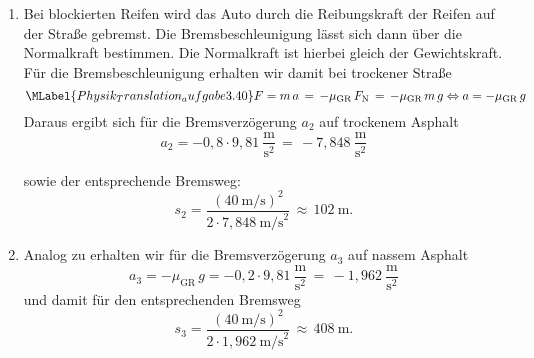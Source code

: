 \begin{MExercises}
\begin{MExercise}
\begin{MSolution}
\begin{enumerate}
               \item Bei blockierten Reifen wird das Auto durch die Reibungskraft der Reifen auf der Stra{\ss}e gebremst. Die Bremsbeschleunigung l\"asst sich dann \"uber die Normalkraft bestimmen. Die Normalkraft ist hierbei gleich der Gewichtskraft.
               F\"ur die Bremsbeschleunigung erhalten wir damit bei trockener Stra{\ss}e
               \begin{equation}\MLabel{Physik_Translation_aufgabe3.40}
               F = m\,a \,=\, -\mu_{\text{GR}}\,F_{\text{N}} \,=\, -\mu_{\text{GR}}\,m\,g
               \Leftrightarrow a = -\mu_{\text{GR}}\,g
               \end{equation}
               Daraus ergibt sich f\"ur die Bremsverz\"ogerung $a_{2}$ auf trockenem Asphalt 
               \begin{equation*}
               a_{2} = -{0,8}\cdot {9,81}~\frac{\text{m}}{\text{s}^{2}} \,=\, -{7,848}~\frac{\text{m}}{\text{s}^{2}}
               \end{equation*}
               
               sowie der entsprechende Bremsweg:
               \begin{equation*}
               s_{2} = \frac{\left(40~\text{m/s}\right)^{2}}{2\cdot {7,848}~\text{m/s}^{2}} \,\approx\, 102~\text{m.}
               \end{equation*}
               \item Analog zu  erhalten wir f\"ur die Bremsverz\"ogerung $a_{3}$ auf nassem Asphalt
               \begin{equation*}
               a_{3} =-\mu_{\text{GR}}\,g= -{0,2}\cdot {9,81}~\frac{\text{m}}{\text{s}^{2}} \,=\, -{1,962}~\frac{\text{m}}{\text{s}^{2}}
               \end{equation*} und damit f\"ur den entsprechenden Bremsweg 
               \begin{equation*}
               s_{3} = \frac{\left(40~\text{m/s}\right)^{2}}{2\cdot {1,962}~\text{m/s}^{2}} \,\approx\, 408~\text{m.}
               \end{equation*}
               \end{enumerate}
               \end{MSolution}
               \end{MExercise}
               \end{MExercises}

\MPrintIndex


